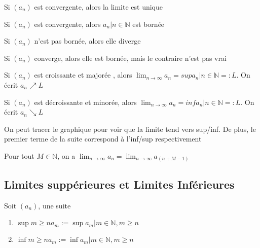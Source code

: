 \documentclass{article}
\begin{document}
\begin{theorem}
    Si $(a_n)$ est convergente, alors la limite est unique
\end{theorem}

\begin{theorem}
Si $(a_n)$ est convergente, alors $a_n | n \in \mathbb{N} $ est bornée
\end{theorem}

\begin{corollary}
    Si $(a_n)$ n'est pas bornée, alors elle diverge
\end{corollary}

\begin{remark}
    Si $(a_n)$ converge, alors elle est bornée, mais le contraire n'est pas vrai
\end{remark}

\begin{theorem}
\item Si $(a_n)$ est croissante et majorée , alors $\lim_{n \to \infty} a_n =
    sup {a_n | n \in \mathbb{N} =: L}$. On écrit $a_n \nearrow L$
\item Si $(a_n)$ est décroissante et minorée, alors $\lim_{n \to \infty} a_n =
    inf{a_n | n \in \mathbb{N} =: L}$. On écrit $a_n \searrow L$
\end{theorem}

\begin{remark}
    On peut tracer le graphique pour voir que la limite tend vers sup/inf.
    De plus, le premier terme de la suite correspond à l'inf/sup respectivement
\end{remark}

\begin{theorem}
    Pour tout $M \in \mathbb{N}$, on a $\lim_{n \to \infty} a_n =
    \lim_{n \to \infty} a_(n+M-1)$
\end{theorem}

\subsection{Limites suppérieures et Limites Inférieures}

\begin{definition}
    Soit $(a_n)$, une suite
    \begin{enumerate}
	\item $ \sup{m \geq n} a_m := \sup{a_m | m \in \mathbb{N}, m \geq n}$
	\item $ \inf{m \geq n} a_m := \inf{a_m | m \in \mathbb{N}, m \geq n}$
    \end{enumerate}
\end{definition}
\end{document}
